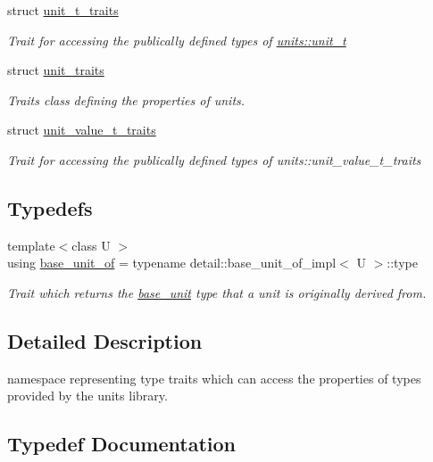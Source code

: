 \begin{DoxyCompactItemize}
struct \hyperlink{structunits_1_1traits_1_1unit__t__traits}{unit\+\_\+t\+\_\+traits}
\begin{DoxyCompactList}\small\item\em Trait for accessing the publically defined types of {\ttfamily \hyperlink{classunits_1_1unit__t}{units\+::unit\+\_\+t}} \end{DoxyCompactList}\item 
struct \hyperlink{structunits_1_1traits_1_1unit__traits}{unit\+\_\+traits}
\begin{DoxyCompactList}\small\item\em Traits class defining the properties of units. \end{DoxyCompactList}\item 
struct \hyperlink{structunits_1_1traits_1_1unit__value__t__traits}{unit\+\_\+value\+\_\+t\+\_\+traits}
\begin{DoxyCompactList}\small\item\em Trait for accessing the publically defined types of {\ttfamily units\+::unit\+\_\+value\+\_\+t\+\_\+traits} \end{DoxyCompactList}\end{DoxyCompactItemize}
\subsection*{Typedefs}
\begin{DoxyCompactItemize}
\item 
{\footnotesize template$<$class U $>$ }\\using \hyperlink{namespaceunits_1_1traits_a3246512e5e5c554d14d183c00dc28428}{base\+\_\+unit\+\_\+of} = typename detail\+::base\+\_\+unit\+\_\+of\+\_\+impl$<$ U $>$\+::type
\begin{DoxyCompactList}\small\item\em Trait which returns the {\ttfamily \hyperlink{structunits_1_1base__unit}{base\+\_\+unit}} type that a unit is originally derived from. \end{DoxyCompactList}\end{DoxyCompactItemize}


\subsection{Detailed Description}
namespace representing type traits which can access the properties of types provided by the units library. 

\subsection{Typedef Documentation}
\hypertarget{namespaceunits_1_1traits_a3246512e5e5c554d14d183c00dc28428}{}
